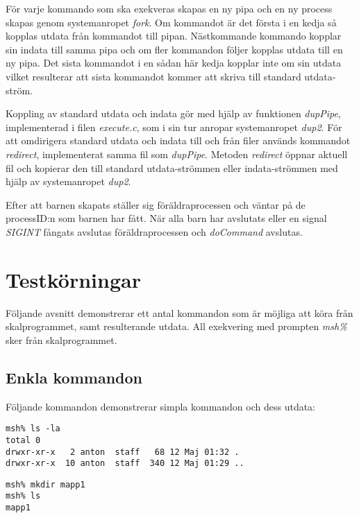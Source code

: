 \documentclass[a4paper, 12pt]{article}
\begin{document}
För varje kommando som ska exekveras skapas en ny pipa och en ny
process skapas genom systemanropet \textit{fork}. Om kommandot är det
första i en kedja så kopplas utdata från kommandot till pipan.
Nästkommande kommando kopplar sin indata till samma pipa och om fler
kommandon följer kopplas utdata till en ny pipa. Det sista kommandot i
en sådan här kedja kopplar inte om sin utdata vilket resulterar att
sista kommandot kommer att skriva till standard utdata-ström.

Koppling av standard utdata och indata gör med hjälp av funktionen
\textit{dupPipe}, implementerad i filen \textit{execute.c}, som i sin
tur anropar systemanropet \textit{dup2}. För att omdirigera standard
utdata och indata till och från filer används kommandot
\textit{redirect}, implementerat samma fil som \textit{dupPipe}.
Metoden \textit{redirect} öppnar aktuell fil och kopierar den till
standard utdata-strömmen eller indata-strömmen med hjälp av
systemanropet \textit{dup2}.

Efter att barnen skapats ställer sig föräldraprocessen och väntar på
de processID:n som barnen har fått. När alla barn har avslutats eller
en signal \textit{SIGINT} fångats avslutas föräldraprocessen och
\textit{doCommand} avslutas.

\section{Testkörningar}\label{sec:testkorningar}
Följande avsnitt demonstrerar ett antal kommandon som är möjliga att
köra från skalprogrammet, samt resulterande utdata. All exekvering med
prompten \textit{msh\%} sker från skalprogrammet.

\subsection{Enkla kommandon}\label{sec:enkla-kommandon}
Följande kommandon demonstrerar simpla kommandon och dess utdata:

\begin{scriptsize}
\begin{verbatim}
msh% ls -la
total 0
drwxr-xr-x   2 anton  staff   68 12 Maj 01:32 .
drwxr-xr-x  10 anton  staff  340 12 Maj 01:29 ..
\end{verbatim}
\end{scriptsize}

\begin{scriptsize}
\begin{verbatim}
msh% mkdir mapp1
msh% ls
mapp1
\end{verbatim}
\end{scriptsize}
\end{document}
